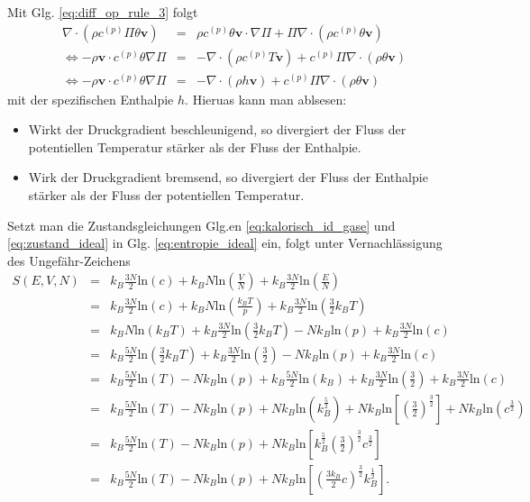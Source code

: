 \documentclass{book}
\renewcommand{\ln}{\text{ln}}
\begin{document}
%
Mit Glg. \eqref{eq:diff_op_rule_3} folgt
%
\begin{eqnarray}
\nabla\cdot\left(\rho c^{(p)}\Pi\theta\mathbf{v}\right) & = & \rho c^{(p)}\theta\mathbf{v}\cdot\nabla\Pi + \Pi\nabla\cdot\left(\rho c^{(p)}\theta\mathbf{v}\right)\nonumber\\
\Leftrightarrow -\rho\mathbf{v}\cdot c^{(p)}\theta\nabla\Pi & = & -\nabla\cdot\left(\rho c^{(p)}T\mathbf{v}\right) +  c^{(p)}\Pi\nabla\cdot\left(\rho\theta\mathbf{v}\right)\nonumber\\
\Leftrightarrow -\rho\mathbf{v}\cdot c^{(p)}\theta\nabla\Pi & = & -\nabla\cdot\left(\rho h\mathbf{v}\right) + c^{(p)}\Pi\nabla\cdot\left(\rho\theta\mathbf{v}\right)\
\end{eqnarray}
%
mit der spezifischen Enthalpie $h$. Hieruas kann man ablsesen:
%
\begin{itemize}
\item Wirkt der Druckgradient beschleunigend, so divergiert der Fluss der potentiellen Temperatur stärker als der Fluss der Enthalpie.
\item Wirk der Druckgradient bremsend, so divergiert der Fluss der Enthalpie stärker als der Fluss der potentiellen Temperatur.
\end{itemize}
%
Setzt man die Zustandsgleichungen Glg.en \eqref{eq:kalorisch_id_gase} und \eqref{eq:zustand_ideal} in Glg. \eqref{eq:entropie_ideal} ein, folgt unter Vernachlässigung des Ungefähr-Zeichens
%
\begin{eqnarray}
S\left(E, V, N\right) & = & k_B\frac{3N}{2}\ln\left(c\right) + k_BN\ln\left(\frac{V}{N}\right) + k_B\frac{3N}{2}\ln\left(\frac{E}{N}\right)\nonumber\\
& = & k_B\frac{3N}{2}\ln\left(c\right) + k_BN\ln\left(\frac{k_BT}{p}\right) + k_B\frac{3N}{2}\ln\left(\frac{3}{2}k_BT\right)\nonumber\\
& = & k_BN\ln\left(k_BT\right) + k_B\frac{3N}{2}\ln\left(\frac{3}{2}k_BT\right) - Nk_B\ln\left(p\right) + k_B\frac{3N}{2}\ln\left(c\right)\nonumber\\
& = & k_B\frac{5N}{2}\ln\left(\frac{3}{2}k_BT\right) + k_B\frac{3N}{2}\ln\left(\frac{3}{2}\right) - Nk_B\ln\left(p\right) + k_B\frac{3N}{2}\ln\left(c\right)\nonumber\\
& = & k_B\frac{5N}{2}\ln\left(T\right) - Nk_B\ln\left(p\right) + k_B\frac{5N}{2}\ln\left(k_B\right) + k_B\frac{3N}{2}\ln\left(\frac{3}{2}\right) + k_B\frac{3N}{2}\ln\left(c\right)\nonumber\\
& = & k_B\frac{5N}{2}\ln\left(T\right) - Nk_B\ln\left(p\right) + Nk_B\ln\left(k_B^{\frac{5}{2}}\right) + Nk_B\ln\left[\left(\frac{3}{2}\right)^\frac{3}{2}\right] + Nk_B\ln\left(c^\frac{3}{2}\right)\nonumber\\
& = & k_B\frac{5N}{2}\ln\left(T\right) - Nk_B\ln\left(p\right) + Nk_B\ln\left[k_B^{\frac{5}{2}}\left(\frac{3}{2}\right)^\frac{3}{2}c^\frac{3}{2}\right]\nonumber\\
& = & k_B\frac{5N}{2}\ln\left(T\right) - Nk_B\ln\left(p\right) + Nk_B\ln\left[\left(\frac{3k_B}{2}c\right)^\frac{3}{2}k_B^{\frac{1}{2}}\right].
\end{eqnarray}
\end{document}
